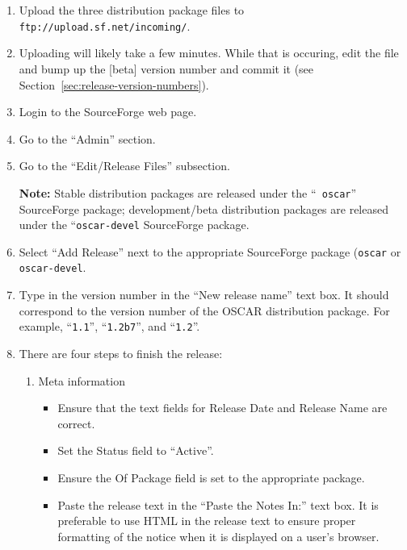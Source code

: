\begin{enumerate}
\item Upload the three distribution package files to {\tt
    ftp://upload.sf.net/incoming/}.
  
\item Uploading will likely take a few minutes.  While that is
  occuring, edit the  file and bump up the [beta]
  version number and commit it (see
  Section~\ref{sec:release-version-numbers}).

\item Login to the SourceForge web page.

\item Go to the ``Admin'' section.

\item Go to the ``Edit/Release Files'' subsection.

{\bf Note:} Stable distribution packages are released under the ``{\tt
  oscar}'' SourceForge package; development/beta distribution packages
  are released under the ``{\tt oscar-devel} SourceForge package.

\item Select ``Add Release'' next to the appropriate SourceForge
  package ({\tt oscar} or {\tt oscar-devel}.

\item Type in the version number in the ``New release name'' text
  box.  It should correspond to the version number of the OSCAR
  distribution package.  For example, ``{\tt 1.1}'', ``{\tt 1.2b7}'',
  and ``{\tt 1.2}''.

\item There are four steps to finish the release:

  \begin{enumerate}

    \item Meta information
      \begin{itemize}
      \item Ensure that the text fields for Release Date and Release
        Name are correct.
        
      \item Set the Status field to ``Active''.
        
      \item Ensure the Of Package field is set to the appropriate
        package.
        
      \item Paste the release text in the ``Paste the Notes In:'' text
        box.  It is preferable to use HTML in the release text to
        ensure proper formatting of the notice when it is displayed on
        a user's browser.
        

\end{itemize}
\end{enumerate}
\end{enumerate}
